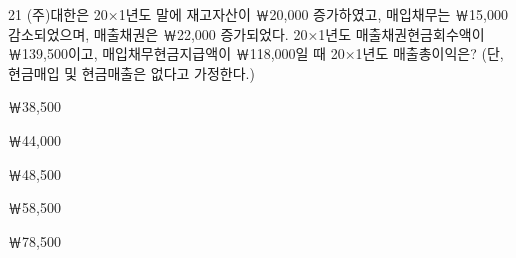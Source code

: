 \begin{question}{21}
(주)대한은 20×1년도 말에 재고자산이 ￦20,000 증가하였고, 매입채무는 ￦15,000 감소되었으며, 매출채권은 ￦22,000 증가되었다. 20×1년도 매출채권현금회수액이 ￦139,500이고, 매입채무현금지급액이 ￦118,000일 때 20×1년도 매출총이익은? (단, 현금매입 및 현금매출은 없다고 가정한다.)
\begin{choices}
  \item ￦38,500
  \item ￦44,000
  \item ￦48,500
  \item ￦58,500
  \item ￦78,500
\end{choices}
\end{question}
